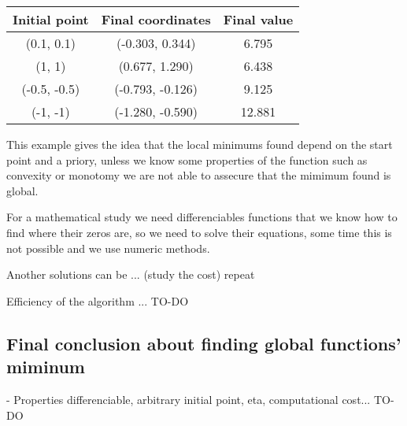 \begin{center}
  \begin{tabular}{ |c|c|c| }
    \hline
    Initial point  & Final coordinates & Final value  \\ 
    \hline
    (0.1, 0.1) &  (-0.303,  0.344) &   6.795 \\
    (1, 1)  & (0.677,  1.290) &   6.438 \\
    (-0.5, -0.5) & (-0.793, -0.126) &   9.125 \\
    (-1, -1) & (-1.280,  -0.590)  & 12.881 \\
 
 \hline
\end{tabular}
\end{center}


This example gives the idea that the local minimums found depend on the start point and a priory, unless we know some properties
of the function such as convexity or monotomy we are not able to assecure that the mimimum found is global.

For a mathematical study we need differenciables functions that we know how to find where their zeros are, so we need to solve their equations, some time
this is not possible and we use numeric methods.

Another solutions can be ... (study the cost) repeat

Efficiency of the algorithm ... TO-DO



\subsection{ Final conclusion about finding global functions' miminum}  


- Properties differenciable, arbitrary initial point, eta, computational cost...  TO-DO


